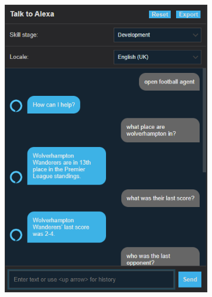 \documentclass[10pt,a4paper,twocolumn]{article}
\begin{document}
\begin{figure}[h!]
    \captionsetup{labelformat=empty}
    \centering
    \begin{subfigure}[b]{0.24\textwidth}
        \centering
        \includegraphics[width=\textwidth]{assets/Screenshot_1.png}
    \end{subfigure}
    \hfill
    \begin{subfigure}[b]{0.24\textwidth}
        \centering

\end{subfigure}
\end{figure}
\end{document}
